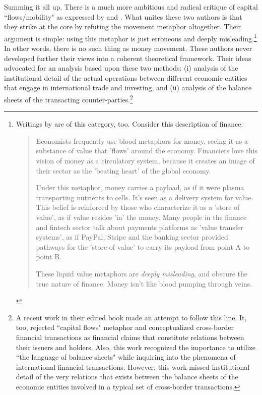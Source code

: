 Summing it all up. There is a much more ambitious and radical critique of capital ``flows/mobility" as expressed by \cite{woodruff2005} and \cite{mosler2005,mosler2010,mosler2022,mosler2023}. What unites these two authors is that they strike at the core by refuting the movement metaphor altogether. Their argument is simple: using this metaphor is just erroneous and deeply misleading.\footnote{Writings by \citeauthor{scott2022} are of this category, too. Consider this description of finance: \begin{quote}Economists frequently use blood metaphors for money, seeing it as a substance of value that 'flows' around the economy. Financiers love this vision of money as a circulatory system, because it creates an image of their sector as the 'beating heart' of the global economy. \par Under this metaphor, money carries a payload, as if it were plasma transporting nutrients to cells. It's seen as a delivery system for value. This belief is reinforced by those who characterize it as a 'store of value', as if value resides 'in' the money. Many people in the finance and fintech sector talk about payments platforms as 'value transfer systems', as if PayPal, Stripe and the banking sector provided pathways for the 'store of value' to carry its payload from point A to point B. \par These liquid value metaphors are \textit{deeply misleading}, and obscure the true nature of finance. Money isn't like blood pumping through veins.~\citep[emphasis added]{scott2024_}\end{quote}} In other words, there is no such thing as money movement.
These authors never developed further their views into a coherent theoretical framework.
Their ideas advocated for an analysis based upon these two methods: (i) analysis of the institutional detail of the actual operations between different economic entities that engage in international trade and investing, and (ii) analysis of the balance sheets of the transacting counter-parties.\footnote{A recent work \citep{braun_kodd2022} in their edited book \citep{braun2022} made an attempt to follow this line. It, too, rejected ``capital flows" metaphor and conceptualized cross-border financial transactions as financial claims that constitute relations between their issuers and holders.   Also, this work recognized the importance to utilize ``the language of balance sheets" while inquiring into the phenomena of international financial transactions.  However, this work missed institutional detail of the very relations that exists between the balance sheets of the economic entities involved in a typical set of cross-border transactions.}

